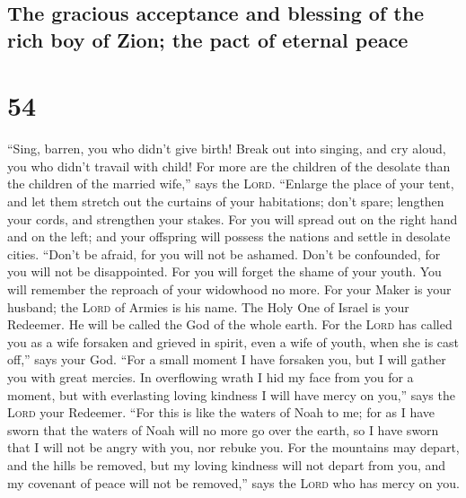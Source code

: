 \hypertarget{the-gracious-acceptance-and-blessing-of-the-rich-boy-of-zion-the-pact-of-eternal-peace}{%
\subsection{The gracious acceptance and blessing of the rich boy of
Zion; the pact of eternal
peace}\label{the-gracious-acceptance-and-blessing-of-the-rich-boy-of-zion-the-pact-of-eternal-peace}}

\hypertarget{section-53}{%
\section{54}\label{section-53}}

 ``Sing, barren, you who didn't give birth! Break out into
singing, and cry aloud, you who didn't travail with child! For more are
the children of the desolate than the children of the married wife,''
says the \textsc{Lord}.  ``Enlarge the place of your tent,
and let them stretch out the curtains of your habitations; don't spare;
lengthen your cords, and strengthen your stakes.  For you
will spread out on the right hand and on the left; and your offspring
will possess the nations and settle in desolate cities. 
``Don't be afraid, for you will not be ashamed. Don't be confounded, for
you will not be disappointed. For you will forget the shame of your
youth. You will remember the reproach of your widowhood no more.
 For your Maker is your husband; the \textsc{Lord} of
Armies is his name. The Holy One of Israel is your Redeemer. He will be
called the God of the whole earth.  For the \textsc{Lord}
has called you as a wife forsaken and grieved in spirit, even a wife of
youth, when she is cast off,'' says your God.  ``For a
small moment I have forsaken you, but I will gather you with great
mercies.  In overflowing wrath I hid my face from you for
a moment, but with everlasting loving kindness I will have mercy on
you,'' says the \textsc{Lord} your Redeemer.  ``For this
is like the waters of Noah to me; for as I have sworn that the waters of
Noah will no more go over the earth, so I have sworn that I will not be
angry with you, nor rebuke you.  For the mountains may
depart, and the hills be removed, but my loving kindness will not depart
from you, and my covenant of peace will not be removed,'' says the
\textsc{Lord} who has mercy on you.

